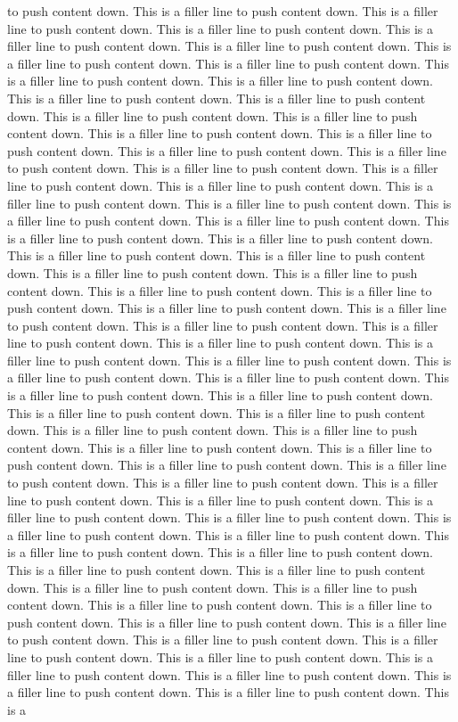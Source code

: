\documentclass[11pt,a4paper]{report}
\begin{document}
to push content down. This is a filler line to push content down. This is a filler line to push content down. This is a filler line to push content down. This is a filler line to push content down. This is a filler line to push content down. This is a filler line to push content down. This is a filler line to push content down. This is a filler line to push content down. This is a filler line to push content down. This is a filler line to push content down. This is a filler line to push content down. This is a filler line to push content down. This is a filler line to push content down. This is a filler line to push content down. This is a filler line to push content down. This is a filler line to push content down. This is a filler line to push content down. This is a filler line to push content down. This is a filler line to push content down. This is a filler line to push content down. This is a filler line to push content down. This is a filler line to push content down. This is a filler line to push content down. This is a filler line to push content down. This is a filler line to push content down. This is a filler line to push content down. This is a filler line to push content down. This is a filler line to push content down. This is a filler line to push content down. This is a filler line to push content down. This is a filler line to push content down. This is a filler line to push content down. This is a filler line to push content down. This is a filler line to push content down. This is a filler line to push content down. This is a filler line to push content down. This is a filler line to push content down. This is a filler line to push content down. This is a filler line to push content down. This is a filler line to push content down. This is a filler line to push content down. This is a filler line to push content down. This is a filler line to push content down. This is a filler line to push content down. This is a filler line to push content down. This is a filler line to push content down. This is a filler line to push content down. This is a filler line to push content down. This is a filler line to push content down. This is a filler line to push content down. This is a filler line to push content down. This is a filler line to push content down. This is a filler line to push content down. This is a filler line to push content down. This is a filler line to push content down. This is a filler line to push content down. This is a filler line to push content down. This is a filler line to push content down. This is a filler line to push content down. This is a filler line to push content down. This is a filler line to push content down. This is a filler line to push content down. This is a filler line to push content down. This is a filler line to push content down. This is a filler line to push content down. This is a filler line to push content down. This is a filler line to push content down. This is a filler line to push content down. This is a filler line to push content down. This is a filler line to push content down. This is a filler line to push content down. This is a filler line to push content down. This is a filler line to push content down. This is a filler line to push content down. This is a filler line to push content down. This is a 
\end{document}
